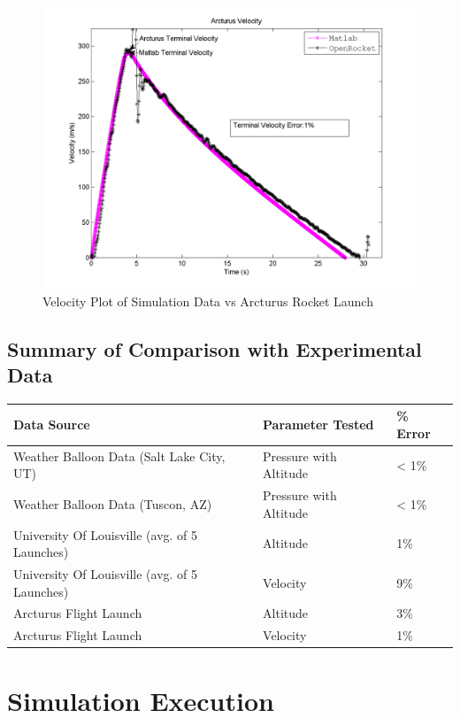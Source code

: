 \documentclass[]{book}
\begin{document}
\begin{figure}[htbp]
\centering
\includegraphics{images/plots/plot_arcturus_velocity_analysis.png}
\caption{Velocity Plot of Simulation Data vs Arcturus Rocket Launch
\label{arc_experimental_comparison_velocity_label}}
\end{figure}

\section{Summary of Comparison with Experimental
Data}\label{summary-of-comparison-with-experimental-data}

\begin{longtable}[c]{@{}lll@{}}
\toprule
Data Source & Parameter Tested & \% Error\tabularnewline
\midrule
\endhead
Weather Balloon Data (Salt Lake City, UT) & Pressure with Altitude &
\textless{} 1\%\tabularnewline
Weather Balloon Data (Tuscon, AZ) & Pressure with Altitude & \textless{}
1\%\tabularnewline
University Of Louisville (avg. of 5 Launches) & Altitude &
1\%\tabularnewline
University Of Louisville (avg. of 5 Launches) & Velocity &
9\%\tabularnewline
Arcturus Flight Launch & Altitude & 3\%\tabularnewline
Arcturus Flight Launch & Velocity & 1\%\tabularnewline
\bottomrule
\end{longtable}


\chapter{Simulation Execution}\label{simulation-execution}
\end{document}

